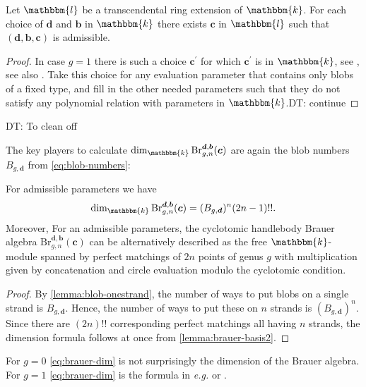 \documentclass[a4paper,11pt]{amsart}
\newcommand{\eg}{\textsl{e.g.}}
\newcommand{\setstuff}[1]{\mathrm{#1}}
\newcommand{\KK}{\mathbbm{k}}
\newcommand{\KKL}{\mathbbm{l}}
\newcommand{\bsym}[1]{\boldsymbol{#1}}
\newcommand{\cpar}{\bsym{c}}
\newcommand{\bpar}{\bsym{b}}
\newcommand{\dpar}{\bsym{d}}
\def\DT#1{\textcolor[rgb]{1.00,0.00,1.00}{DT: #1}}
\numberwithin{equation}{section}
\let\fullref\autoref
\begin{document}
\begin{lemma}\label{lemma:handlebody-blobbmw-second}
Let $\KKL$ be a transcendental ring extension of $\KK$.
For each choice of $\dpar$ and $\bpar$ in $\KK$ there exists $\cpar$
in $\KKL$
such that $(\dpar,\bpar,\cpar)$ is admissible.
\end{lemma}

\begin{proof}
In case $g=1$ there is such a choice $\cpar^{\prime}$ 
for which $\cpar^{\prime}$ is in $\KK$, see 
\cite[Theorem 3.2]{GoHaMo-cyclotomic-bmw2}, see also
\cite{WiYu-cyclotomic-bmw}.
Take this choice for any evaluation parameter that contains 
only blobs of a fixed type, and fill in the other 
needed parameters such that they do not satisfy any 
polynomial relation with parameters in $\KK$.\DT{continue}
\end{proof}

\DT{To clean off}

The key players to calculate 
$\dim_{\KK}\setstuff{Br}_{g,n}^{\dpar,\bpar}(\cpar)$
are again the blob numbers $B_{g,\dpar}$
from \eqref{eq:blob-numbers}:

\begin{proposition}\label{proposition:brauer-dim}
For admissible parameters we have 
\begin{gather}\label{eq:brauer-dim}
\dim_{\KK}\setstuff{Br}_{g,n}^{\dpar,\bpar}(\cpar)
=
(B_{g,\dpar})^{n}(2n-1)!!.
\end{gather}
Moreover, For an admissible parameters, the cyclotomic handlebody 
Brauer algebra $\setstuff{Br}_{g,n}^{\dpar,\bpar}(\cpar)$ can be alternatively 
described as the free $\KK$-module spanned by 
perfect matchings of $2n$ points of genus $g$ with multiplication 
given by concatenation and circle evaluation modulo the cyclotomic 
condition. 
\end{proposition}

\begin{proof}
By \fullref{lemma:blob-onestrand}, the number of ways to put blobs 
on a single strand is $B_{g,\dpar}$. Hence, 
the number of ways to put these on $n$ strands is 
$(B_{g,\dpar})^{n}$. Since there are $(2n)!!$ corresponding 
perfect matchings all having $n$ strands, 
the dimension formula follows at once from \fullref{lemma:brauer-basis2}.
\end{proof}

\begin{example}
For $g=0$ \eqref{eq:brauer-dim} is not surprisingly the dimension 
of the Brauer algebra. For $g=1$ \eqref{eq:brauer-dim} 
is the formula in {\eg} \cite[Section 11]{HaOl-cyclotomic-bmw} or
\cite[Theorem 4.11]{Yu-cyclotomic-bmw}.
\end{example}
\end{document}
